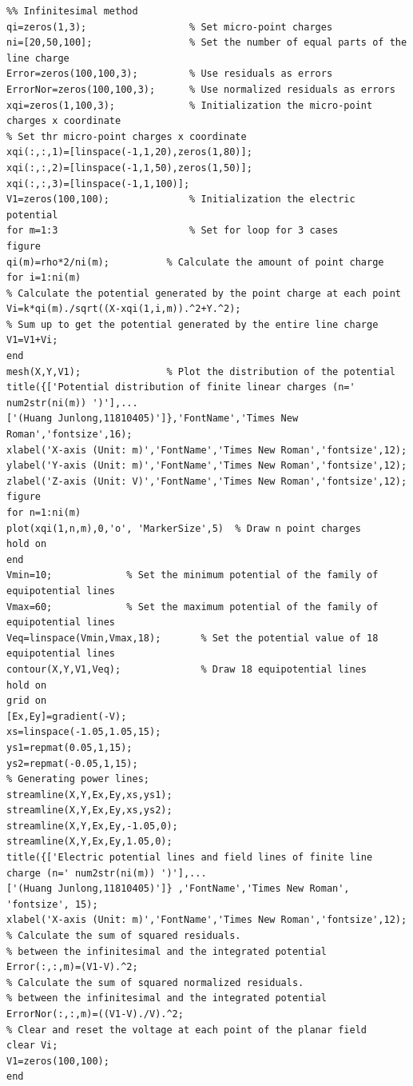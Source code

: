 \documentclass[journal,twocolumn,letterpaper]{IEEEJERM}
\begin{document}
\begin{lstlisting}
%% Infinitesimal method
qi=zeros(1,3);                  % Set micro-point charges
ni=[20,50,100];                 % Set the number of equal parts of the line charge        
Error=zeros(100,100,3);         % Use residuals as errors
ErrorNor=zeros(100,100,3);      % Use normalized residuals as errors
xqi=zeros(1,100,3);             % Initialization the micro-point charges x coordinate
% Set thr micro-point charges x coordinate
xqi(:,:,1)=[linspace(-1,1,20),zeros(1,80)];  
xqi(:,:,2)=[linspace(-1,1,50),zeros(1,50)];
xqi(:,:,3)=[linspace(-1,1,100)];
V1=zeros(100,100);              % Initialization the electric potential
for m=1:3                       % Set for loop for 3 cases
figure
qi(m)=rho*2/ni(m);          % Calculate the amount of point charge
for i=1:ni(m)
% Calculate the potential generated by the point charge at each point
Vi=k*qi(m)./sqrt((X-xqi(1,i,m)).^2+Y.^2);  
% Sum up to get the potential generated by the entire line charge
V1=V1+Vi;
end
mesh(X,Y,V1);               % Plot the distribution of the potential
title({['Potential distribution of finite linear charges (n=' num2str(ni(m)) ')'],...
['(Huang Junlong,11810405)']},'FontName','Times New Roman','fontsize',16); 
xlabel('X-axis (Unit: m)','FontName','Times New Roman','fontsize',12);   
ylabel('Y-axis (Unit: m)','FontName','Times New Roman','fontsize',12);   
zlabel('Z-axis (Unit: V)','FontName','Times New Roman','fontsize',12);  
figure
for n=1:ni(m)              
plot(xqi(1,n,m),0,'o', 'MarkerSize',5)  % Draw n point charges
hold on
end
Vmin=10;             % Set the minimum potential of the family of equipotential lines
Vmax=60;             % Set the maximum potential of the family of equipotential lines
Veq=linspace(Vmin,Vmax,18);       % Set the potential value of 18 equipotential lines
contour(X,Y,V1,Veq);              % Draw 18 equipotential lines
hold on
grid on
[Ex,Ey]=gradient(-V); 
xs=linspace(-1.05,1.05,15);
ys1=repmat(0.05,1,15);
ys2=repmat(-0.05,1,15);
% Generating power lines;
streamline(X,Y,Ex,Ey,xs,ys1);
streamline(X,Y,Ex,Ey,xs,ys2);
streamline(X,Y,Ex,Ey,-1.05,0);
streamline(X,Y,Ex,Ey,1.05,0);
title({['Electric potential lines and field lines of finite line charge (n=' num2str(ni(m)) ')'],...
['(Huang Junlong,11810405)']} ,'FontName','Times New Roman', 'fontsize', 15);      
xlabel('X-axis (Unit: m)','FontName','Times New Roman','fontsize',12);
% Calculate the sum of squared residuals. 
% between the infinitesimal and the integrated potential
Error(:,:,m)=(V1-V).^2;
% Calculate the sum of squared normalized residuals. 
% between the infinitesimal and the integrated potential
ErrorNor(:,:,m)=((V1-V)./V).^2;
% Clear and reset the voltage at each point of the planar field
clear Vi;
V1=zeros(100,100);
end


\end{lstlisting}
\end{document}

